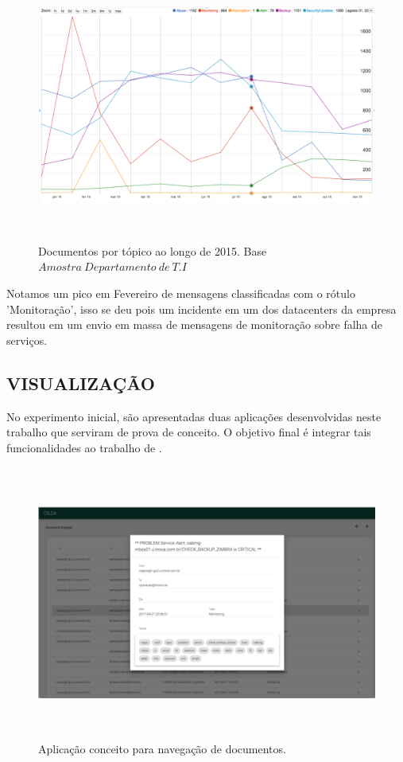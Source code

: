 \documentclass[12pt,a4paper]{article}
\begin{document}
\begin{figure}[H]
	\centering
    \includegraphics[height=9cm]{images/figure_7.png}
    \caption{Documentos por tópico ao longo de 2015. Base $Amostra\ Departamento\ de\ T.I$}
    \label{fig-documents-over-2015}
\end{figure}
 
Notamos um pico em Fevereiro de mensagens classificadas
 com o rótulo 'Monitoração', isso se deu pois um incidente em um dos datacenters da empresa resultou em
 um envio em massa de mensagens de monitoração sobre falha de serviços.

\subsection{VISUALIZAÇÃO} \label{sec:visualizacao}

No experimento inicial, são apresentadas duas aplicações desenvolvidas neste trabalho que serviram de prova de conceito.
 O objetivo final é integrar tais funcionalidades ao trabalho de .

\begin{figure}[H]
  \centering
  \includegraphics[height=9cm]{images/figure_8.png}
  \caption{Aplicação conceito para navegação de documentos.}
  \label{fig-doc-explorer}
\end{figure}
\end{document}
